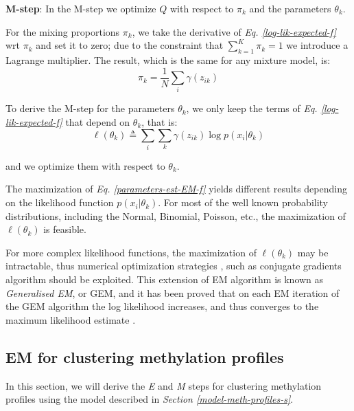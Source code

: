 \noindent
\textbf{M-step}: In the M-step we optimize $Q$ with respect to $\pi_{k}$ and the parameters $\theta_{k}$.

For the mixing proportions $\pi_{k}$, we take the derivative of \emph{Eq. \ref{log-lik-expected-f}} wrt $\pi_{k}$ and set it to zero; due to the constraint that $\sum_{k=1}^{K}\pi_{k} = 1$ we introduce a Lagrange multiplier. The result, which is the same for any mixture model, is:
\begin{equation} \label{mixing-proportions-est-f}
		\pi_{k} = \frac{1}{N} \sum_{i} \gamma(z_{ik})
\end{equation}

To derive the M-step for the parameters $\theta_{k}$, we only keep the terms of \emph{Eq. \ref{log-lik-expected-f}} that depend on $\theta_{k}$, that is:
\begin{equation} \label{parameters-est-EM-f}
		\ell(\theta_{k}) \triangleq \sum_{i} \sum_{k} \gamma(z_{ik}) \log p(x_{i}|\theta_{k})
\end{equation}

and we optimize them with respect to $\theta_{k}$.

The maximization of \emph{Eq. \ref{parameters-est-EM-f}} yields different results depending on the likelihood function $p(x_{i}|\theta_{k})$. For most of the well known probability distributions, including the Normal, Binomial, Poisson, etc., the maximization of $\ell(\theta_{k})$ is feasible. 

For more complex likelihood functions, the maximization of $\ell(\theta_{k})$ may be intractable, thus numerical optimization strategies \citep{Nocedal2006}, such as conjugate gradients algorithm \citep{Hestenes1952} should be exploited. This extension of EM algorithm is known as \emph{Generalised EM}, or GEM, and it has been proved that on each EM iteration of the GEM algorithm the log likelihood increases, and thus converges to the maximum likelihood estimate \citep{Wu1983}.

\subsection{EM for clustering methylation profiles}
In this section, we will derive the \emph{E} and \emph{M} steps for clustering methylation profiles using the model described in \emph{Section \ref{model-meth-profiles-s}}.

